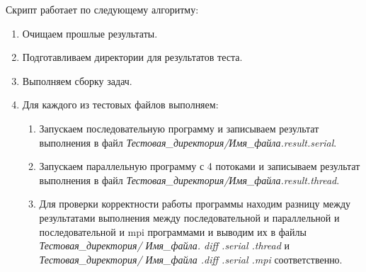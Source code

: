 \documentclass[12pt,a4paper]{report}
\begin{document}
			Скрипт работает по следующему алгоритму:
			\begin{enumerate}
				\item Очищаем прошлые результаты.
				\item Подготавливаем директории для результатов теста.
				\item Выполняем сборку задач.
				\item Для каждого из тестовых файлов выполняем:
					\begin{enumerate}
						\item Запускаем последовательную программу и записываем результат выполнения в файл \textit{Тестовая\_директория/Имя\_файла.result.serial}.
						\item Запускаем параллельную программу с 4 потоками и записываем результат выполнения в файл \textit{Тестовая\_директория/Имя\_файла.result.thread}.
						\item Для проверки корректности работы программы находим разницу между результатами выполнения между последовательной и параллельной и последовательной и mpi программами и выводим их в файлы \textit{Тестовая\_директория/ Имя\_файла. diff .serial .thread} и \textit{Тестовая\_директория/ Имя\_файла .diff .serial .mpi} соответственно.
					\end{enumerate}
			\end{enumerate}
\end{document}
